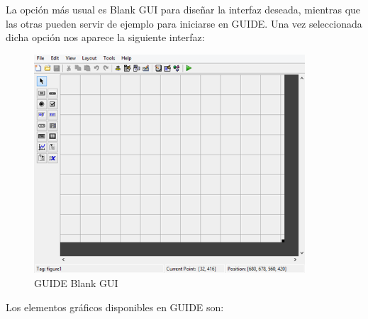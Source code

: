 La opción más usual es Blank GUI para diseñar la interfaz deseada, mientras que las otras pueden servir de ejemplo para iniciarse en GUIDE. Una vez seleccionada dicha opción nos aparece la siguiente interfaz:


\begin{figure}[H]
\centering
\includegraphics[width=0.9\textwidth]{imagenes/figuras/6_2.png}
\caption{GUIDE Blank GUI}
\end{figure}
\bigskip

Los elementos gráficos disponibles en GUIDE son:

